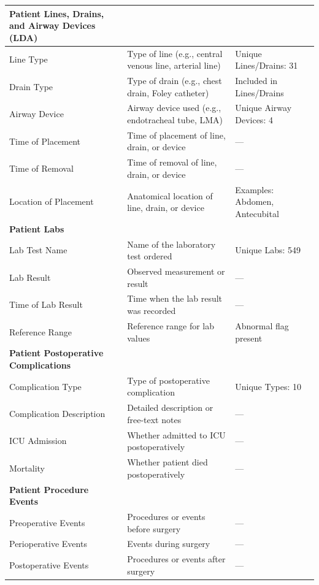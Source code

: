 \documentclass[11pt]{article}
\begin{document}
\begin{table}[htbp]
{\begin{tabular}{lll}
\midrule
\textbf{Patient Lines, Drains, and Airway Devices (LDA)} & & \\
\midrule
Line Type             & Type of line (e.g., central venous line, arterial line) & Unique Lines/Drains: 31 \\
Drain Type            & Type of drain (e.g., chest drain, Foley catheter) & Included in Lines/Drains \\
Airway Device         & Airway device used (e.g., endotracheal tube, LMA) & Unique Airway Devices: 4 \\
Time of Placement     & Time of placement of line, drain, or device & --- \\
Time of Removal       & Time of removal of line, drain, or device & --- \\
Location of Placement & Anatomical location of line, drain, or device & Examples: Abdomen, Antecubital \\

\midrule
\textbf{Patient Labs} & & \\
\midrule
Lab Test Name       & Name of the laboratory test ordered & Unique Labs: 549 \\
Lab Result          & Observed measurement or result & --- \\
Time of Lab Result  & Time when the lab result was recorded & --- \\
Reference Range     & Reference range for lab values & Abnormal flag present \\

\midrule
\textbf{Patient Postoperative Complications} & & \\
\midrule
Complication Type        & Type of postoperative complication & Unique Types: 10 \\
Complication Description & Detailed description or free-text notes & --- \\
ICU Admission            & Whether admitted to ICU postoperatively & --- \\
Mortality                & Whether patient died postoperatively & --- \\

\midrule
\textbf{Patient Procedure Events} & & \\
\midrule
Preoperative Events  & Procedures or events before surgery & --- \\
Perioperative Events & Events during surgery & --- \\
Postoperative Events & Procedures or events after surgery & --- \\

\bottomrule
\end{tabular}
}
\end{table}
\end{document}
